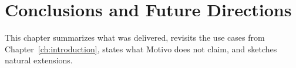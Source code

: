 \chapter{Conclusions and Future Directions}\label{ch:conclusion}

This chapter summarizes what was delivered, revisits the use cases from Chapter~\ref{ch:introduction}, states what
Motivo does not claim, and sketches natural extensions.






